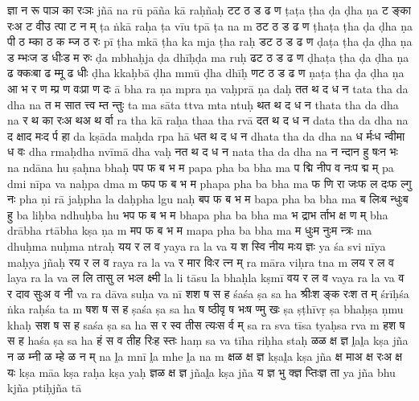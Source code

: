 \documentclass{article}
\begin{document}
{{ज्ञा न रू पा}{ञ का रः}{ञः}}%
{{jñā na rū pā}{ña kā raḥ}{ñaḥ}}
\card
{ट}{ट ठ ड ढ ण}%
{ṭa}{ṭa ṭha ḍa ḍha ṇa}
{{ट ङ्का रः}{अ ट वी}{उ त्पा ट न म्}}%
{{ṭa ṅkā raḥ}{a ṭa vī}{u tpā ṭa na m}}
\card
{ठ}{ट ठ ड ढ ण}%
{ṭha}{ṭa ṭha ḍa ḍha ṇa}
{{पी ठ म्}{का ठ क म्}{ज ठ रः}}%
{{pī ṭha m}{kā ṭha ka m}{ja ṭha raḥ}}
\card
{ड}{ट ठ ड ढ ण}%
{ḍa}{ṭa ṭha ḍa ḍha ṇa}
{{ड म्भः}{ज ड धीः}{ड म रुः}}%
{{ḍa mbhaḥ}{ja ḍa dhīḥ}{ḍa ma ruḥ}}
\card
{ढ}{ट ठ ड ढ ण}%
{ḍha}{ṭa ṭha ḍa ḍha ṇa}
{{ढ क्कः}{बा ढ म्}{मू ढ धीः}}%
{{ḍha kkaḥ}{bā ḍha m}{mū ḍha dhīḥ}}
\card
{ण}{ट ठ ड ढ ण}%
{ṇa}{ṭa ṭha ḍa ḍha ṇa}
{{आ भ र ण म्}{प्र ण वः}{प्रा ण दः}}%
{{ā bha ra ṇa m}{pra ṇa vaḥ}{prā ṇa daḥ}}
\card
{त}{त थ द ध न}%
{ta}{ta tha da dha na}
{{त म सा}{त त्त्व म्}{त न्तुः}}%
{{ta ma sā}{ta ttva m}{ta ntuḥ}}
\card
{थ}{त थ द ध न}%
{tha}{ta tha da dha na}
{{र थ का रः}{अ थ}{अ थ र्वा}}%
{{ra tha kā raḥ}{a tha}{a tha rvā}}
\card
{द}{त थ द ध न}%
{da}{ta tha da dha na}
{{द क्षा}{द मः}{द र्प हा}}%
{{da kṣā}{da maḥ}{da rpa hā}}
\card
{ध}{त थ द ध न}%
{dha}{ta tha da dha na}
{{ध र्मः}{ध न्वी}{मा ध वः}}%
{{dha rmaḥ}{dha nvī}{mā dha vaḥ}}
\card
{न}{त थ द ध न}%
{na}{ta tha da dha na}
{{न न्दा}{न हु षः}{न भः}}%
{{na ndā}{na hu ṣaḥ}{na bhaḥ}}
\card
{प}{प फ ब भ म}%
{pa}{pa pha ba bha ma}
{{प द्मि नी}{प व नः}{प द्म म्}}%
{{pa dmi nī}{pa va naḥ}{pa dma m}}
\card
{फ}{प फ ब भ म}%
{pha}{pa pha ba bha ma}
{{फ णि रा जः}{फ ल दः}{फ ल्गु नः}}%
{{pha ṇi rā jaḥ}{pha la daḥ}{pha lgu naḥ}}
\card
{ब}{प फ ब भ म}%
{ba}{pa pha ba bha ma}
{{ब लिः}{ब न्धुः}{ब हु}}%
{{ba liḥ}{ba ndhuḥ}{ba hu}}
\card
{भ}{प फ ब भ म}%
{bha}{pa pha ba bha ma}
{{भ द्रा}{भ र्ता}{भ क्ष ण म्}}%
{{bha drā}{bha rtā}{bha kṣa ṇa m}}
\card
{म}{प फ ब भ म}%
{ma}{pa pha ba bha ma}
{{म धुः}{म नुः}{म न्त्रः}}%
{{ma dhuḥ}{ma nuḥ}{ma ntraḥ}}
\card
{य}{य र ल व}%
{ya}{ya ra la va}
{{य श स्वि नी}{य मः}{य ज्ञः}}%
{{ya śa svi nī}{ya maḥ}{ya jñaḥ}}
\card
{र}{य र ल व}%
{ra}{ya ra la va}
{{र मा}{र विः}{र त्न म्}}%
{{ra mā}{ra viḥ}{ra tna m}}
\card
{ल}{य र ल व}%
{la}{ya ra la va}
{{ल लि ता}{सु ल भः}{ल क्ष्मी}}%
{{la li tā}{su la bhaḥ}{la kṣmī}}
\card
{व}{य र ल व}%
{va}{ya ra la va}
{{व र दा}{व सुः}{अ व नी}}%
{{va ra dā}{va suḥ}{a va nī}}
\card
{श}{श ष स ह}%
{śa}{śa ṣa sa ha}
{{श्रीः}{श ङ्क रः}{श त म्}}%
{{śrīḥ}{śa ṅka raḥ}{śa ta m}}
\card
{ष}{श ष स ह}%
{ṣa}{śa ṣa sa ha}
{{ष ष्ठी}{वृ ष भः}{ष ण्मु खः}}%
{{ṣa ṣṭhī}{vṛ ṣa bhaḥ}{ṣa ṇmu khaḥ}}
\card
{स}{श ष स ह}%
{sa}{śa ṣa sa ha}
{{स र स्व ती}{स त्यः}{स र्व म्}}%
{{sa ra sva tī}{sa tyaḥ}{sa rva m}}
\card
{ह}{श ष स ह}%
{ha}{śa ṣa sa ha}
{{हं स व ती}{ह रिः}{ह स्तः}}%
{{haṃ sa va tī}{ha riḥ}{ha staḥ}}
\card
{ळ}{ळ क्ष ज्ञ}%
{l̤a}{l̤a kṣa jña}
{{न ळ म्}{नी ळ म्}{हे ळ न म्}}%
{{na l̤a m}{nī l̤a m}{he l̤a na m}}
\card
{क्ष}{ळ क्ष ज्ञ}%
{kṣa}{l̤a kṣa jña}
{{क्ष मा}{अ क्ष रः}{अ क्ष यः}}%
{{kṣa mā}{a kṣa raḥ}{a kṣa yaḥ}}
\card
{ज्ञ}{ळ क्ष ज्ञ}%
{jña}{l̤a kṣa jña}
{{य ज्ञ भु क्}{ज्ञ प्तिः}{ज्ञ ता}}%
{{ya jña bhu k}{jña ptiḥ}{jña tā}}
\end{document}
